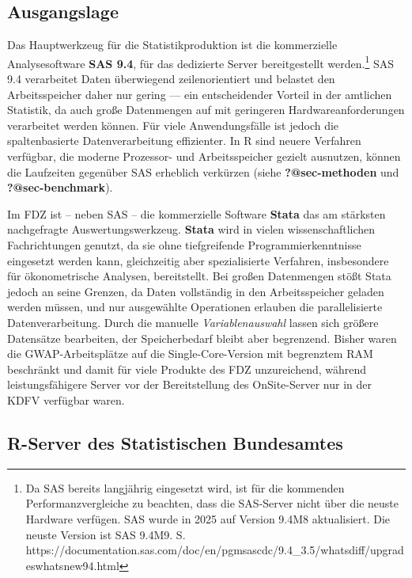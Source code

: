 \documentclass[
  german,
  10pt,
  twoside]{article}
\let\oldtextbf\textbf
\renewcommand{\textbf}[1]{{\color{wistaBlue}\oldtextbf{#1}}}
\begin{document}
\subsection{Ausgangslage}\label{ausgangslage}

Das Hauptwerkzeug für die Statistikproduktion ist die kommerzielle
Analysesoftware \textbf{SAS 9.4}, für das dedizierte Server
bereitgestellt werden.\footnote{Da SAS bereits langjährig eingesetzt
  wird, ist für die kommenden Performanzvergleiche zu beachten, dass die
  SAS-Server nicht über die neuste Hardware verfügen. SAS wurde in 2025
  auf Version 9.4M8 aktualisiert. Die neuste Version ist SAS 9.4M9. S.
  https://documentation.sas.com/doc/en/pgmsascdc/9.4\_3.5/whatsdiff/upgradeswhatsnew94.html}
SAS 9.4 verarbeitet Daten überwiegend zeilenorientiert und belastet den
Arbeitsspeicher daher nur gering --- ein entscheidender Vorteil in der
amtlichen Statistik, da auch große Datenmengen auf mit geringeren
Hardwareanforderungen verarbeitet werden können. Für viele
Anwendungsfälle ist jedoch die spaltenbasierte Datenverarbeitung
effizienter. In R sind neuere Verfahren verfügbar, die moderne
Prozessor- und Arbeitsspeicher gezielt ausnutzen, können die Laufzeiten
gegenüber SAS erheblich verkürzen (siehe \textbf{?@sec-methoden} und
\textbf{?@sec-benchmark}).

Im FDZ ist -- neben SAS -- die kommerzielle Software \textbf{Stata} das
am stärksten nachgefragte Auswertungswerkzeug. \textbf{Stata} wird in
vielen wissenschaftlichen Fachrichtungen genutzt, da sie ohne
tiefgreifende Programmierkenntnisse eingesetzt werden kann, gleichzeitig
aber spezialisierte Verfahren, insbesondere für ökonometrische Analysen,
bereitstellt. Bei großen Datenmengen stößt Stata jedoch an seine
Grenzen, da Daten vollständig in den Arbeitsspeicher geladen werden
müssen, und nur ausgewählte Operationen erlauben die parallelisierte
Datenverarbeitung. Durch die manuelle \emph{Variablenauswahl} lassen
sich größere Datensätze bearbeiten, der Speicherbedarf bleibt aber
begrenzend. Bisher waren die GWAP-Arbeitsplätze auf die
Single-Core-Version mit begrenztem RAM beschränkt und damit für viele
Produkte des FDZ unzureichend, während leistungsfähigere Server vor der
Bereitstellung des OnSite-Server nur in der KDFV verfügbar waren.

\subsection{R-Server des Statistischen
Bundesamtes}\label{r-server-des-statistischen-bundesamts}
\end{document}
